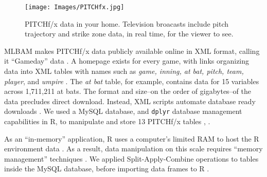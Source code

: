         \begin{figure}[H]
      	\centering
      	\texttt{[image: Images/PITCHfx.jpg]} 
      	\caption{PITCHf/x\textsuperscript{\textregistered} data in your home. Television broacasts include pitch trajectory and strike zone data, in real time, for the viewer to see.}
      	\end{figure} 
MLBAM\textsuperscript{\textregistered} makes PITCHf/x\textsuperscript{\textregistered} data publicly available online in XML format, calling it ``Gameday'' data \citep{Sievert2014}. A homepage exists for every game, with links organizing data into XML tables with names such as {\it game, inning, at bat, pitch, team, player}, and {\it umpire} \citep{Sievert2014}. The {\it at bat} table, for example, contains data for 15 variables across 1,711,211 at bats. The format and size--on the order of gigabytes--of the data precludes direct download. Instead, XML scripts automate database ready downloads \citep{Adler2006}. We used a MySQL database, and \verb|dplyr| database management capabilities in R, to manipulate and store 13 PITCHf/x\textsuperscript{\textregistered} tables \citep{Tahaghoghi2006}, \citep{Wickham2016}. 

As an ``in-memory'' application, R uses a computer's limited RAM to host the R environment data \citep{Smith2013}. As a result, data manipulation on this scale requires ``memory management'' techniques \citep{Wickham2014}.  We applied Split-Apply-Combine operations to tables inside the MySQL database, before importing data frames to R \citep{Wickham2011}.

